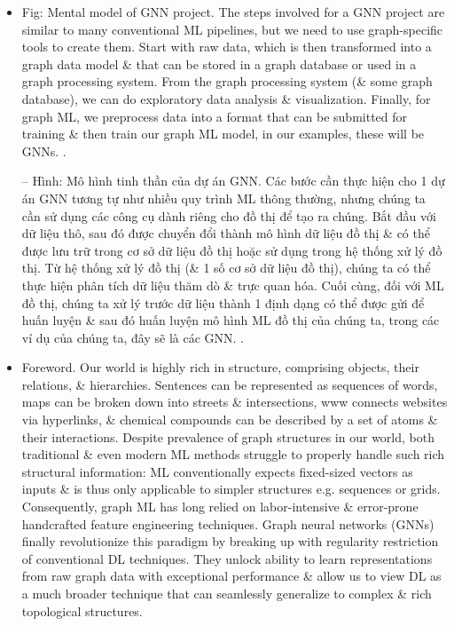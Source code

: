 \documentclass{article}
\begin{document}
\begin{itemize}
    \item {\sf Fig: Mental model of GNN project.}  The steps involved for a GNN project are similar to many conventional ML pipelines, but we need to use graph-specific tools to create them. Start with raw data, which is then transformed into a graph data model \& that can be stored in a graph database or used in a graph processing system. From the graph processing system (\& some graph database), we can do exploratory data analysis \& visualization. Finally, for graph ML, we preprocess data into a format that can be submitted for training \& then train our graph ML model, in our examples, these will be GNNs. .

    -- {\sf Hình: Mô hình tinh thần của dự án GNN.} Các bước cần thực hiện cho 1 dự án GNN tương tự như nhiều quy trình ML thông thường, nhưng chúng ta cần sử dụng các công cụ dành riêng cho đồ thị để tạo ra chúng. Bắt đầu với dữ liệu thô, sau đó được chuyển đổi thành mô hình dữ liệu đồ thị \& có thể được lưu trữ trong cơ sở dữ liệu đồ thị hoặc sử dụng trong hệ thống xử lý đồ thị. Từ hệ thống xử lý đồ thị (\& 1 số cơ sở dữ liệu đồ thị), chúng ta có thể thực hiện phân tích dữ liệu thăm dò \& trực quan hóa. Cuối cùng, đối với ML đồ thị, chúng ta xử lý trước dữ liệu thành 1 định dạng có thể được gửi để huấn luyện \& sau đó huấn luyện mô hình ML đồ thị của chúng ta, trong các ví dụ của chúng ta, đây sẽ là các GNN. .
    \item {\sf Foreword.} Our world is highly rich in structure, comprising objects, their relations, \& hierarchies. Sentences can be represented as sequences of words, maps can be broken down into streets \& intersections, www connects websites via hyperlinks, \& chemical compounds can be described by a set of atoms \& their interactions. Despite prevalence of graph structures in our world, both traditional \& even modern ML methods struggle to properly handle such rich structural information: ML conventionally expects fixed-sized vectors as inputs \& is thus only applicable to simpler structures e.g. sequences or grids. Consequently, graph ML has long relied on labor-intensive \& error-prone handcrafted feature engineering techniques. Graph neural networks (GNNs) finally revolutionize this paradigm by breaking up with regularity restriction of conventional DL techniques. They unlock ability to learn representations from raw graph data with exceptional performance \& allow us to view DL as a much broader technique that can seamlessly generalize to complex \& rich topological structures.


\end{itemize}
\end{document}
